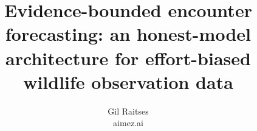 \documentclass[10pt,twocolumn]{article}
\title{Evidence-bounded encounter forecasting: an honest-model architecture
       for effort-biased wildlife observation data}
\author{Gil Raitses \\ \small aimez.ai}
\date{}
\begin{document}
\maketitle

\fontsize{8.45}{9.25}\selectfont



\newcommand{\eqintensity}{%
  \begin{equation}
  \label{eq:intensity}
  \log \lambda(x,t) = b_0 + \sum_{k} \beta_k \, \phi_k(t) + \log E(x,t)
  \end{equation}
}
\newcommand{\eqnulltest}{%
  \begin{equation}
  \label{eq:nulltest}
  p_{\text{null}} = P\!\bigl(T(\text{shuffled}) \geq T(\text{observed})\bigr)
  \end{equation}
}
\newcommand{\eqtrescaling}{%
  \begin{equation}
  \label{eq:trescaling}
  \tau_i = \Lambda(t_i) - \Lambda(t_{i-1}), \quad \tau_i \overset{\mathrm{H}_0}{\sim} \mathrm{Exp}(1)
  \end{equation}
}
\newcommand{\eqeffconf}{%
  \begin{equation}
  \label{eq:effconf}
  c_{\text{eff}} = c_{\text{raw}} \cdot \prod_{k} g_k, \quad g_k \in \{0, 1\}
  \end{equation}
}
\newcommand{\eqdevskill}{%
  \begin{equation}
  \label{eq:devskill}
  S_D = 1 - \frac{D_{\text{model}}}{D_{\text{null}}}
  \end{equation}
}
\newcommand{\eqpit}{%
  \begin{equation}
  \label{eq:pit}
  u_i = F_{\text{model}}(y_i), \quad u_i \overset{\mathrm{H}_0}{\sim} \mathrm{Uniform}(0,1)
  \end{equation}
}
\newcommand{\equncited}{%
  \begin{equation}
  \label{eq:uncited}
  R_{\text{uncited}} = \frac{\bigl|\{ s \in S_{\mathrm{sci}} : \nexists\; \text{cited\_name} \in s \}\bigr|}{|S_{\mathrm{sci}}|}
  \end{equation}
}
\newcommand{\eqcmxgraph}{%
  \begin{equation}
  \label{eq:cmxgraph}
  G = (V, E), \quad V = \{\text{metric}, C, M, X, D, R\}
  \end{equation}
}












\clearpage
\nocite{*}
\printbibliography[title={References}]

\appendix

\end{document}
